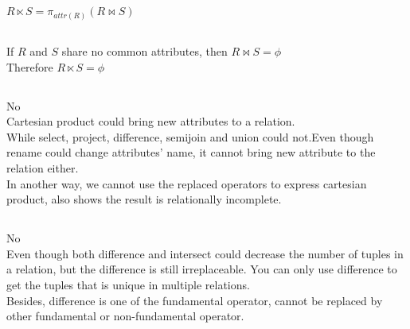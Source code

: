 \documentclass{article}
\begin{document}
\section{}
\subsection{}
$R\ltimes S=\pi_{attr(R)}(R\bowtie S)$
\subsection{}
If $R$ and $S$ share no common attributes, then $R\bowtie S=\phi$\\
Therefore $R\ltimes S=\phi$\\
\subsection{}
No\\
Cartesian product could bring new attributes to a relation.\\
While select, project, difference, semijoin and union could not.Even though rename could change attributes' name, it cannot bring new attribute to the relation either.\\
In another way, we cannot use the replaced operators to express cartesian product, also shows the result is relationally incomplete.\\

\subsection{}
No\\
Even though both difference and intersect could decrease the number of tuples in a relation, but the difference is still irreplaceable. You can only use difference to get the tuples that is unique in multiple relations.\\
Besides, difference is one of the fundamental operator, cannot be replaced by other fundamental or non-fundamental operator.\\
\end{document}
